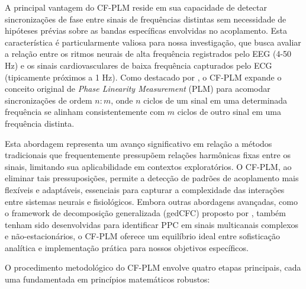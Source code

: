 A principal vantagem do CF-PLM reside em sua capacidade de detectar sincronizações de fase entre sinais de frequências distintas sem necessidade de hipóteses prévias sobre as bandas específicas envolvidas no acoplamento. Esta característica é particularmente valiosa para nossa investigação, que busca avaliar a relação entre os ritmos neurais de alta frequência registrados pelo EEG (4-50 Hz) e os sinais cardiovasculares de baixa frequência capturados pelo ECG (tipicamente próximos a 1 Hz). Como destacado por , o CF-PLM expande o conceito original de \textit{Phase Linearity Measurement} (PLM) para acomodar sincronizações de ordem \(n:m\), onde \(n\) ciclos de um sinal em uma determinada frequência se alinham consistentemente com \(m\) ciclos de outro sinal em uma frequência distinta.

Esta abordagem representa um avanço significativo em relação a métodos tradicionais que frequentemente pressupõem relações harmônicas fixas entre os sinais, limitando sua aplicabilidade em contextos exploratórios. O CF-PLM, ao eliminar tais pressuposições, permite a detecção de padrões de acoplamento mais flexíveis e adaptáveis, essenciais para capturar a complexidade das interações entre sistemas neurais e fisiológicos. Embora outras abordagens avançadas, como o framework de decomposição generalizada (gedCFC) proposto por , também tenham sido desenvolvidas para identificar PPC em sinais multicanais complexos e não-estacionários, o CF-PLM oferece um equilíbrio ideal entre sofisticação analítica e implementação prática para nossos objetivos específicos.

O procedimento metodológico do CF-PLM envolve quatro etapas principais, cada uma fundamentada em princípios matemáticos robustos:

